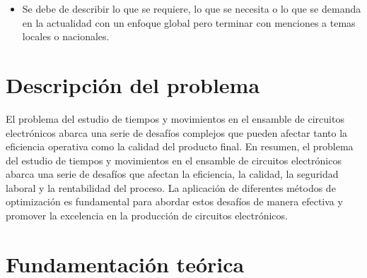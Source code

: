     
        \begin{itemize}
           \item Se debe de describir lo que se requiere, lo que se necesita o lo que se demanda en la actualidad con un enfoque global pero terminar con menciones a temas locales o nacionales.
        \end{itemize}
        \section{Descripción del problema}
        El problema del estudio de tiempos y movimientos en el ensamble de circuitos electrónicos abarca una serie de desafíos complejos que pueden afectar tanto la eficiencia operativa como la calidad del producto final.
        En resumen, el problema del estudio de tiempos y movimientos en el ensamble de circuitos electrónicos abarca una serie de desafíos que afectan la eficiencia, la calidad, la seguridad laboral y la rentabilidad del proceso. La aplicación de diferentes métodos de optimización es fundamental para abordar estos desafíos de manera efectiva y promover la excelencia en la producción de circuitos electrónicos.
    
        \section{Fundamentación teórica}
    
